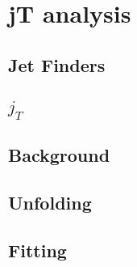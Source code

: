 

\section{jT analysis}
\label{sec:methods}

\subsection{Jet Finders}

\subsection{$j_T$ }

\subsection{Background}

\subsection{Unfolding}

\subsection{Fitting}

